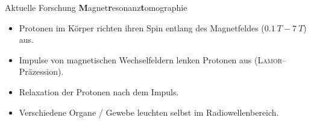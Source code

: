 \documentclass[t,9pt]{beamer}
\begin{document}

        \begin{frame}{Aktuelle Forschung}
                \textbf{M}agnet\textbf{r}esonanz\textbf{t}omographie
                \begin{itemize}
                        \item Protonen im Körper richten ihren Spin entlang des Magnetfeldes ($\SI{0.1}{T}-\SI{7}{T}$) aus.
                        \item Impulse von magnetischen Wechselfeldern lenken Protonen aus (\textsc{Lamor}--Präzession).
                        \item Relaxation der Protonen nach dem Impuls.
                        \item Verschiedene Organe / Gewebe leuchten selbst im Radiowellenbereich.
                \end{itemize}
                \hfill\cite{Mustafa2023}
        \end{frame}
\end{document}
